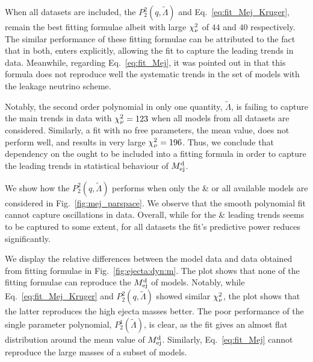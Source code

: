 When all datasets are included, the $P_2^2(q,\tilde{\Lambda})$ and 
Eq.~\eqref{eq:fit_Mej_Kruger}, remain the best fitting formulae albeit with large 
$\chi_{\nu}^2$ of $44$ and $40$ respectively.
%
The similar performance of these fitting formulae can be attributed to the fact that in 
both, \mr{} enters explicitly, allowing the fit to capture the leading trends in data. 
Meanwhile, regarding Eq.~\eqref{eq:fit_Mej}, it was pointed out in 
\citet{Radice:2018pdn} that this formula does not reproduce well the systematic 
trends in the set of models with the leakage neutrino scheme.

Notably, the second order polynomial in only one quantity, $\tilde{\Lambda}$, is failing to capture the main trends in data with $\chi_{\nu}^2=123$ when all models 
from all datasets are considered. 
Similarly, a fit with no free parameters, the mean value, does not perform well, 
and results in very large $\chi_{\nu}^2=196$.
%
Thus, we conclude that dependency on the \mr{} ought to be included into a fitting 
formula in order to capture the leading trends in statistical behaviour of $M^{\text{d}}_{\text{ej}}$.


We show how the $P_2^2(q,\tilde{\Lambda})$ performs when only the 
\DSrefset{} \& \DSheatcool{} or all available models are considered in  Fig.~\ref{fig:mej_parspace}. %
We observe that the smooth polynomial fit cannot capture oscillations in data.
Overall, while for the \DSrefset{} \& \DSheatcool{} leading trends seems to 
be captured to some extent, for all datasets the fit's predictive power 
reduces significantly.
%



We display the relative differences between the model data and data obtained from 
fitting formulae in 
Fig.~\ref{fig:ejecta:dyn:m}. The plot shows that none of the fitting formulae can 
reproduce the $M^{\text{d}}_{\text{ej}}$ of \DScool{} models. %
%
Notably, while Eq.~\eqref{eq:fit_Mej_Kruger} and $P_2^2(q,\tilde{\Lambda})$ 
showed similar $\chi_{\nu}^2$, the plot shows that the latter reproduces the high 
ejecta masses better. 
The poor performance of the single parameter polynomial, $P_2^1(\tilde{\Lambda})$,
is clear, as the fit gives an almost flat distribution around the mean value of $M^{\text{d}}_{\text{ej}}$.
Similarly, Eq.~\eqref{eq:fit_Mej} cannot reproduce the large masses of a subset of 
models.
%

